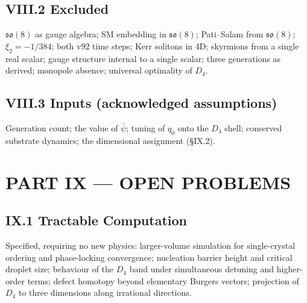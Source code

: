 \documentclass[11pt,a4paper]{article}
\begin{document}
\subsection{VIII.2 Excluded}
$\mathfrak{so}(8)$ as gauge algebra; SM embedding in $\mathfrak{so}(8)$; Pati--Salam from $\mathfrak{so}(8)$; $\xi_2 = -1/384$; both v92 time steps; Kerr solitons in 4D; skyrmions from a single real scalar; gauge structure internal to a single scalar; three generations as derived; monopole absence; universal optimality of $D_4$.

\subsection{VIII.3 Inputs (acknowledged assumptions)}
Generation count; the value of $\bar{\psi}$; tuning of $q_0$ onto the $D_4$ shell; conserved substrate dynamics; the dimensional assignment (\S IX.2).

\section{PART IX --- OPEN PROBLEMS}

\subsection{IX.1 Tractable Computation}
Specified, requiring no new physics: larger-volume simulation for single-crystal ordering and phase-locking convergence; nucleation barrier height and critical droplet size; behaviour of the $D_4$ band under simultaneous detuning and higher-order terms; defect homotopy beyond elementary Burgers vectors; projection of $D_4$ to three dimensions along irrational directions.
\end{document}
